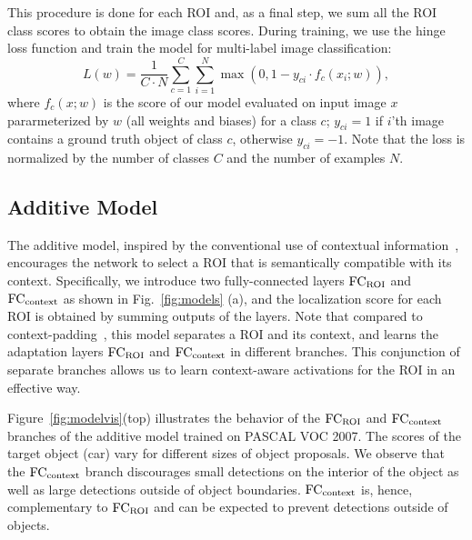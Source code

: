 This procedure is done for each ROI and, as a final step, we sum all the ROI
class scores to obtain the image class scores. During training, we use the hinge
loss function and train the model for multi-label image classification: $$L(w) =
\frac{1}{C \cdot N}\sum_{c=1}^{C}\sum_{i=1}^{N}\max(0, 1 - y_{ci} \cdot f_c(x_i;
w)),$$ where $f_c(x; w)$ is the score of our model evaluated on input image $x$
pararmeterized by $w$ (all weights and biases) for a class $c$; $y_{ci} = 1$ if
$i$'th image contains a ground truth object of class $c$, otherwise $y_{ci} =
-1$. Note that the loss is normalized by the number of classes $C$ and the
number of examples $N$. 




\subsection{Additive Model} \label{sec:additive}


The additive model, inspired by the conventional use of contextual
information~\cite{Oliva:2007ui,Rabinovich:2007wy,Felzenszwalb:2009wx,Girshick:2016ig,Gidaris:2015cx},
encourages the network to select a ROI that is semantically compatible with its context. 
Specifically, we introduce two fully-connected layers ${\rm FC_{ROI}}$ and ${\rm FC_{context}}$ as shown in Fig.~\ref{fig:models} (a), and the localization score for each ROI is obtained by summing outputs of the layers. Note that compared to context-padding~\cite{Girshick:2016ig}, 
this model separates a ROI and its
context, and learns the adaptation layers ${\rm FC_{ROI}}$ and ${\rm
FC_{context}}$ in different branches. This conjunction of separate
branches allows us to learn context-aware activations for the ROI in an
effective way. %

Figure~\ref{fig:modelvis}(top) illustrates the behavior of the ${\rm FC_{ROI}}$ and ${\rm FC_{context}}$
branches of the additive model trained on PASCAL VOC 2007. The scores of
the target object (car) vary for different sizes of object proposals.
We observe that the ${\rm FC_{context}}$ branch discourages small detections on the
interior of the object as well as large detections outside of object boundaries.
${\rm FC_{context}}$ is, hence, complementary to ${\rm FC_{ROI}}$ and can be expected to prevent detections
outside of objects.



